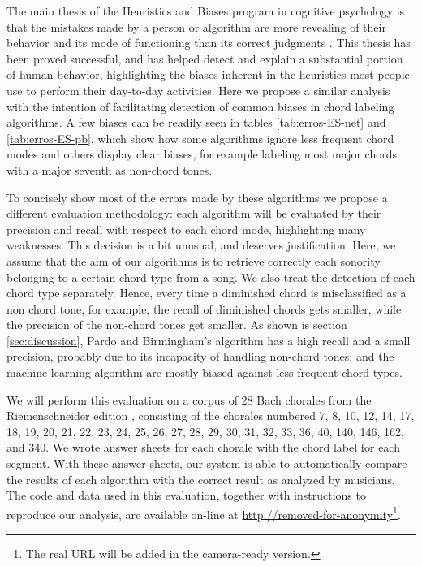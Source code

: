 \documentclass{article}
\begin{document}
The main thesis of the Heuristics and Biases program in cognitive
psychology is that the mistakes made by a person or algorithm are more
revealing of their behavior and its mode of functioning than its
correct judgments \cite{gilovich.ea02:heuristics}. This thesis has
been proved successful, and has helped detect and explain a
substantial portion of human behavior, highlighting the biases
inherent in the heuristics most people use to perform their day-to-day
activities. Here we propose a similar analysis with the intention of
facilitating detection of common biases in chord labeling
algorithms. A few biases can be readily seen in tables
\ref{tab:erros-ES-net} and \ref{tab:erros-ES-pb}, which show how some
algorithms ignore less frequent chord modes and others display clear
biases, for example labeling most major chords with a major seventh as
non-chord tones.

To concisely show most of the errors made by these algorithms we
propose a different evaluation methodology: each algorithm will be
evaluated by their precision and recall with respect to each chord
mode, highlighting many weaknesses. This decision is a bit unusual,
and deserves justification. Here, we assume that the aim of our
algorithms is to retrieve correctly each sonority belonging to a
certain chord type from a song. We also treat the detection of each
chord type separately. Hence, every time a diminished chord is
misclassified as a non chord tone, for example, the recall of
diminished chords gets smaller, while the precision of the non-chord
tones get smaller. As shown is section \ref{sec:discussion}, Pardo and
Birmingham's algorithm has a high recall and a small precision,
probably due to its incapacity of handling non-chord tones; and the
machine learning algorithm are mostly biased against less frequent
chord types.

We will perform this evaluation on a corpus of 28 Bach chorales from
the Riemenschneider edition \cite{bach41:371}, consisting of the
chorales numbered 7, 8, 10, 12, 14, 17, 18, 19, 20, 21, 22, 23, 24,
25, 26, 27, 28, 29, 30, 31, 32, 33, 36, 40, 140, 146, 162, and 340. We
wrote answer sheets for each chorale with the chord label for each
segment. With these answer sheets, our system is able to automatically
compare the results of each algorithm with the correct result as
analyzed by musicians. The code and data used in this evaluation,
together with instructions to reproduce our analysis, are available
on-line at \url{http://removed-for-anonymity}\footnote{The real URL
  will be added in the camera-ready version.}.
\end{document}
